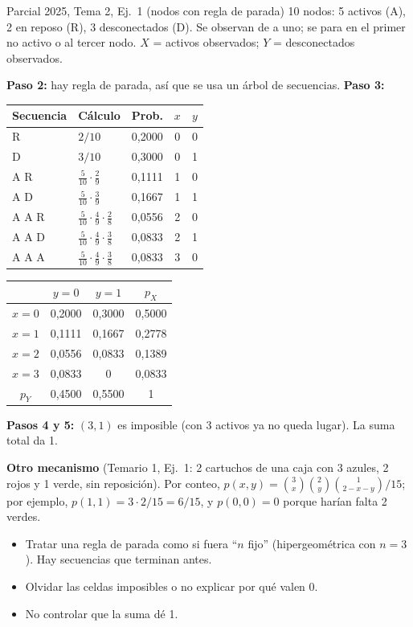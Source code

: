 \begin{modelo}{Parcial 2025, Tema 2, Ej.\ 1 (nodos con regla de parada)}
10 nodos: 5 activos (A), 2 en reposo (R), 3 desconectados (D). Se observan de a uno; se para en el primer no activo o al tercer nodo. $X$ = activos observados; $Y$ = desconectados observados.

\textbf{Paso 2:} hay regla de parada, así que se usa un árbol de secuencias.
\textbf{Paso 3:}
\begin{center}
\begin{tabular}{@{}lllcc@{}}
\toprule
Secuencia & Cálculo & Prob. & $x$ & $y$\\\midrule
R & $2/10$ & 0,2000 & 0 & 0\\
D & $3/10$ & 0,3000 & 0 & 1\\
A R & $\frac5{10}\cdot\frac29$ & 0,1111 & 1 & 0\\
A D & $\frac5{10}\cdot\frac39$ & 0,1667 & 1 & 1\\
A A R & $\frac5{10}\cdot\frac49\cdot\frac28$ & 0,0556 & 2 & 0\\
A A D & $\frac5{10}\cdot\frac49\cdot\frac38$ & 0,0833 & 2 & 1\\
A A A & $\frac5{10}\cdot\frac49\cdot\frac38$ & 0,0833 & 3 & 0\\\bottomrule
\end{tabular}
\qquad
\begin{tabular}{@{}c|cc|c@{}}
\toprule
& $y=0$ & $y=1$ & $p_X$\\\midrule
$x=0$ & 0,2000 & 0,3000 & 0,5000\\
$x=1$ & 0,1111 & 0,1667 & 0,2778\\
$x=2$ & 0,0556 & 0,0833 & 0,1389\\
$x=3$ & 0,0833 & 0 & 0,0833\\\midrule
$p_Y$ & 0,4500 & 0,5500 & 1\\\bottomrule
\end{tabular}
\end{center}
\textbf{Pasos 4 y 5:} $(3,1)$ es imposible (con 3 activos ya no queda lugar). La suma total da 1. \checkmark

\textbf{Otro mecanismo} (Temario 1, Ej.\ 1: 2 cartuchos de una caja con 3 azules, 2 rojos y 1 verde, sin reposición). Por conteo, $p(x,y)=\binom3x\binom2y\binom1{2-x-y}/15$; por ejemplo, $p(1,1)=3\cdot2/15=6/15$, y $p(0,0)=0$ porque harían falta 2 verdes.
\end{modelo}
\begin{ojo}
\begin{itemize}
\item Tratar una regla de parada como si fuera ``$n$ fijo'' (hipergeométrica con $n=3$). Hay secuencias que terminan antes.
\item Olvidar las celdas imposibles o no explicar por qué valen 0.
\item No controlar que la suma dé 1.
\end{itemize}
\end{ojo}

